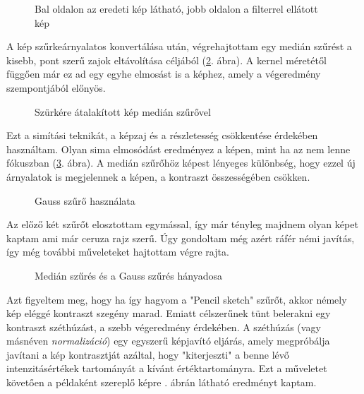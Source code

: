 \begin{figure}[ht]
\centering
{}
\caption{Bal oldalon az eredeti kép látható, jobb oldalon a filterrel ellátott kép} 
\label{fig:pencil1}
\end{figure}


A kép szűrkeárnyalatos konvertálása után, végrehajtottam egy medián szűrést a kisebb, pont szerű zajok eltávolítása céljából (\ref{fig:pencil2}. ábra). A kernel méretétől függően már ez ad egy egyhe elmosást is a képhez, amely a végeredmény szempontjából előnyös.

\begin{figure}[ht]
\centering
{}
\caption{Szürkére átalakított kép medián szűrővel} 
\label{fig:pencil2}
\end{figure}


Ezt a simítási teknikát, a képzaj  és a részletesség csökkentése érdekében használtam. Olyan sima elmosódást eredményez a képen, mint ha az nem lenne fókuszban (\ref{fig:pencil3}. ábra). A medián szűrőhöz képest lényeges különbség, hogy ezzel új árnyalatok is megjelennek a képen, a kontraszt összességében csökken.

\begin{figure}[ht]
\centering
{}
\caption{Gauss szűrő használata } 
\label{fig:pencil3}
\end{figure}



Az előző két szűrőt elosztottam egymással, így már tényleg majdnem olyan képet kaptam ami már ceruza rajz szerű. Úgy gondoltam még azért ráfér némi javítás, így még további műveleteket hajtottam végre rajta.

\begin{figure}[ht] 
\centering
{}
\caption{Medián szűrés és a Gauss szűrés hányadosa } 
\label{fig: pencil4}
\end{figure}


Azt figyeltem meg, hogy ha így hagyom a "Pencil sketch" szűrőt, akkor némely kép eléggé kontraszt szegény marad. Emiatt célszerűnek tünt belerakni egy kontraszt széthúzást, a szebb végeredmény érdekében. A széthúzás (vagy másnéven \textit{normalizáció}) egy egyszerű képjavító eljárás, amely megpróbálja javítani a kép kontrasztját azáltal, hogy "kiterjeszti" a benne lévő intenzitásértékek tartományát a kívánt értéktartományra. Ezt a műveletet követően a példaként szereplő képre . ábrán látható eredményt kaptam.


